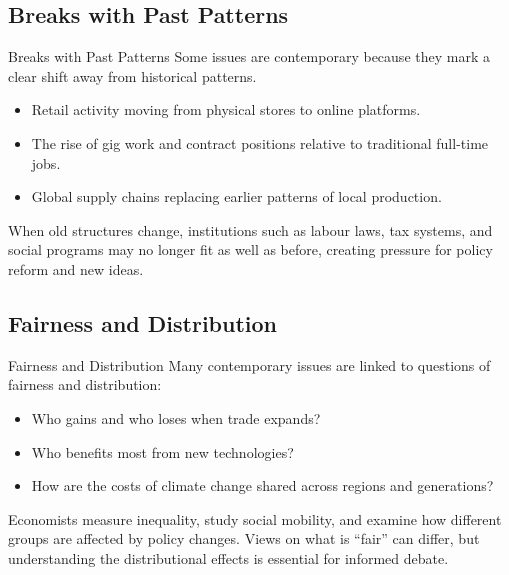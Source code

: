 \documentclass[aspectratio=169]{beamer}
\begin{document}
\subsection{Breaks with Past Patterns}

\begin{frame}{Breaks with Past Patterns}
  \transfade
  Some issues are contemporary because they mark a clear shift away from historical patterns.

  \begin{itemize}[<+->]
    \item Retail activity moving from physical stores to online platforms.
    \item The rise of gig work and contract positions relative to traditional full-time jobs.
    \item Global supply chains replacing earlier patterns of local production.
  \end{itemize}

  \vspace{0.3cm}
  When old structures change, institutions such as labour laws, tax systems, and social
  programs may no longer fit as well as before, creating pressure for policy reform and new ideas.
\end{frame}

\subsection{Fairness and Distribution}

\begin{frame}{Fairness and Distribution}
  \transfade
  Many contemporary issues are linked to questions of fairness and distribution:

  \begin{itemize}[<+->]
    \item Who gains and who loses when trade expands?
    \item Who benefits most from new technologies?
    \item How are the costs of climate change shared across regions and generations?
  \end{itemize}

  \vspace{0.3cm}
  Economists measure inequality, study social mobility, and examine how different groups
  are affected by policy changes. Views on what is ``fair'' can differ, but understanding the
  distributional effects is essential for informed debate.
\end{frame}
\end{document}
